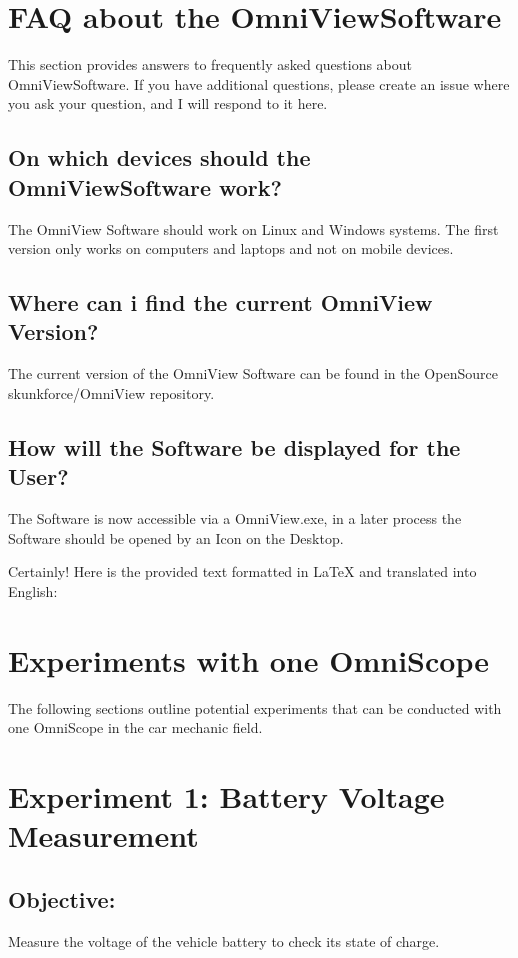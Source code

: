 \documentclass[]{scrreprt}
\begin{document}
    \section{FAQ about the OmniViewSoftware}

    This section provides answers to frequently asked questions about OmniViewSoftware. If you have additional questions, please create an issue where you ask your question, and I will respond to it here.

    \subsection{On which devices should the OmniViewSoftware work?}

    The OmniView Software should work on Linux and Windows systems. The first version only works on computers and laptops and not on mobile devices.

    \subsection{Where can i find the current OmniView Version?}

    The current version of the OmniView Software can be found in the OpenSource skunkforce/OmniView repository.

    \subsection{How will the Software be displayed for the User?}

    The Software is now accessible via a OmniView.exe, in a later process the Software should be opened by an Icon on the Desktop. 

    Certainly! Here is the provided text formatted in LaTeX and translated into English:

    \section{Experiments with one OmniScope}
    The following sections outline potential experiments that can be conducted with one OmniScope in the car mechanic field. 

    \section*{Experiment 1: Battery Voltage Measurement}
    \subsection*{Objective:} Measure the voltage of the vehicle battery to check its state of charge.
\end{document}

